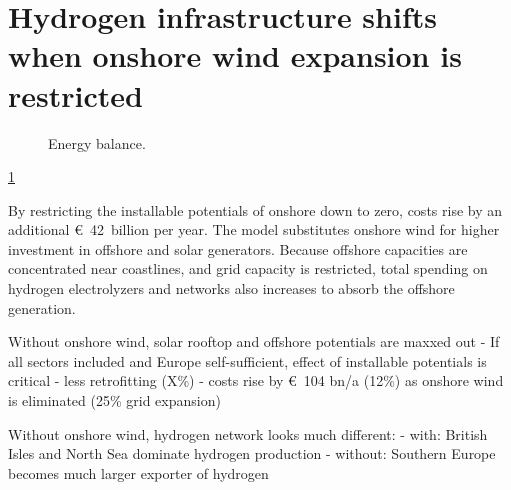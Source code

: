 \section*{Hydrogen infrastructure shifts when onshore wind expansion is restricted}
\label{sec:onwind}

\begin{figure}
    \centering
    \caption{Energy balance.}
    \label{fig:no-onw}
\end{figure}

\cref{fig:no-onw}

By restricting the installable
potentials of onshore down to zero, costs rise by an additional \euro~42~billion
per year. The model substitutes onshore wind for
higher investment in offshore and solar generators. Because offshore capacities
are concentrated near coastlines, and grid capacity is restricted, total
spending on hydrogen electrolyzers and networks also increases to absorb the
offshore generation.

Without onshore wind, solar rooftop and offshore potentials are maxxed out
- If all sectors included and Europe self-sufficient, effect of installable potentials is critical
- less retrofitting (X\%)
- costs rise by \euro~104 bn/a (12\%) as onshore wind is eliminated (25\% grid expansion)

Without onshore wind, hydrogen network looks much different:
- with: British Isles and North Sea dominate hydrogen production
- without: Southern Europe becomes much larger exporter of hydrogen